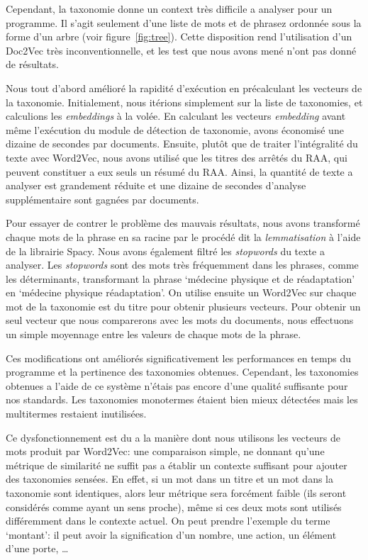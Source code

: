 Cependant, la taxonomie donne un context très difficile a analyser pour un programme.
Il s'agit seulement d'une liste de mots et de phrasez ordonnée sous la forme d'un arbre (voir figure~\ref{fig:tree}).
Cette disposition rend l'utilisation d'un Doc2Vec très inconventionnelle, et les test que nous avons mené n'ont pas donné de résultats.


Nous tout d'abord amélioré la rapidité d'exécution en précalculant les vecteurs de la taxonomie.
Initialement, nous itérions simplement sur la liste de taxonomies, et calculions les \textit{embeddings} à la volée.
En calculant les vecteurs \textit{embedding} avant même l'exécution du module de détection de taxonomie, avons économisé une dizaine de secondes par documents.
Ensuite, plutôt que de traiter l'intégralité du texte avec Word2Vec, nous avons utilisé que les titres des arrêtés du RAA, qui peuvent constituer a eux seuls un résumé du RAA\@.
Ainsi, la quantité de texte a analyser est grandement réduite et une dizaine de secondes d'analyse supplémentaire sont gagnées par documents.

Pour essayer de contrer le problème des mauvais résultats, nous avons transformé chaque mots de la phrase en sa racine par le procédé dit la \textit{lemmatisation} à l'aide de la librairie Spacy\cite{spacy}.
Nous avons également filtré les \textit{stopwords} du texte a analyser.
Les \textit{stopwords} sont des mots très fréquemment dans les phrases, comme les déterminants, transformant la phrase `médecine physique et de réadaptation' en `médecine physique réadaptation'.
On utilise ensuite un Word2Vec sur chaque mot de la taxonomie est du titre pour obtenir plusieurs vecteurs.
Pour obtenir un seul vecteur que nous comparerons avec les mots du documents, nous effectuons un simple moyennage entre les valeurs de chaque mots de la phrase.


Ces modifications ont améliorés significativement les performances en temps du programme et la pertinence des taxonomies obtenues.
Cependant, les taxonomies obtenues a l'aide de ce système n'étais pas encore d'une qualité suffisante pour nos standards.
Les taxonomies monotermes étaient bien mieux détectées mais les multitermes restaient inutilisées.


Ce dysfonctionnement est du a la manière dont nous utilisons les vecteurs de mots produit par Word2Vec: une comparaison simple, ne donnant qu'une métrique de similarité ne suffit pas a établir un contexte suffisant pour ajouter des taxonomies sensées.
En effet, si un mot dans un titre et un mot dans la taxonomie sont identiques, alors leur métrique sera forcément faible (ils seront considérés comme ayant un sens proche), même si ces deux mots sont utilisés différemment dans le contexte actuel.
On peut prendre l'exemple du terme `montant': il peut avoir la signification d'un nombre, une action, un élément d'une porte, \ldots


